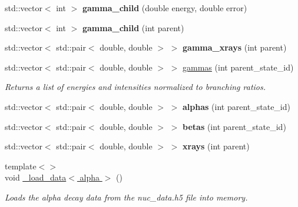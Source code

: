 \begin{DoxyCompactItemize}
std\+::vector$<$ int $>$ {\bfseries gamma\+\_\+child} (double energy, double error)
\item 
\mbox{\label{namespacepyne_af691388c16c1d0c5ddc9a40a74ae8311}} 
std\+::vector$<$ int $>$ {\bfseries gamma\+\_\+child} (int parent)
\item 
\mbox{\label{namespacepyne_a0453b68ad87cb9ca636a24000f45c3e6}} 
std\+::vector$<$ std\+::pair$<$ double, double $>$ $>$ {\bfseries gamma\+\_\+xrays} (int parent)
\item 
std\+::vector$<$ std\+::pair$<$ double, double $>$ $>$ \hyperlink{namespacepyne_a8eeb397c67e950ae3b78c02a6a09655b}{gammas} (int parent\+\_\+state\+\_\+id)
\begin{DoxyCompactList}\small\item\em Returns a list of energies and intensities normalized to branching ratios. \end{DoxyCompactList}\item 
\mbox{\label{namespacepyne_afab6c1fd5c10dd2582c242fc04296e0f}} 
std\+::vector$<$ std\+::pair$<$ double, double $>$ $>$ {\bfseries alphas} (int parent\+\_\+state\+\_\+id)
\item 
\mbox{\label{namespacepyne_af2c502044eaf54a9b575f66f0e38daa3}} 
std\+::vector$<$ std\+::pair$<$ double, double $>$ $>$ {\bfseries betas} (int parent\+\_\+state\+\_\+id)
\item 
\mbox{\label{namespacepyne_a086ed3576eb51bbdc721fbd5754ecf30}} 
std\+::vector$<$ std\+::pair$<$ double, double $>$ $>$ {\bfseries xrays} (int parent)
\item 
\mbox{\label{namespacepyne_a673b0b45ebe0592568a4562122a18bbb}} 
{\footnotesize template$<$$>$ }\\void \hyperlink{namespacepyne_a673b0b45ebe0592568a4562122a18bbb}{\+\_\+load\+\_\+data$<$ alpha $>$} ()
\begin{DoxyCompactList}\small\item\em Loads the alpha decay data from the nuc\+\_\+data.\+h5 file into memory. \end{DoxyCompactList}\item 
\mbox{\label{namespacepyne_a99b2ffce326da5691c5a9845160e2941}} 

\end{DoxyCompactItemize}
